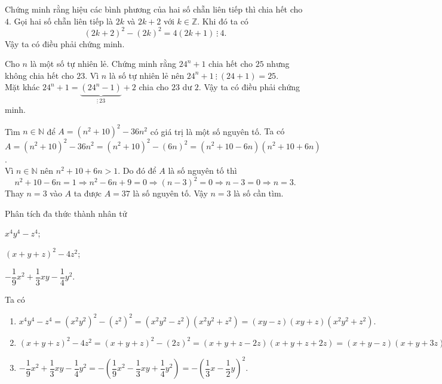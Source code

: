\begin{vd}
	Chứng minh rằng hiệu các bình phương của hai số chẵn liên tiếp thì chia hết cho $4$.
	\loigiai 
	{
		Gọi hai số chẵn liên tiếp là $2k$ và $2k+2$ với $k \in \mathbb{Z}$. Khi đó ta có
		\[(2k+2)^2 - (2k)^2 = 4(2k+1) \ \vdots \ 4.\]
		Vậy ta có điều phải chứng minh.
	}
\end{vd}

\begin{vd}
	Cho $n$ là một số tự nhiên lẻ. Chứng minh rằng $24^n + 1$ chia hết cho $25$ nhưng không chia hết cho $23$.
	\loigiai 
	{
		Vì $n$ là số tự nhiên lẻ nên $24^n + 1 \ \vdots \ (24+1) = 25$.  \\ 
		Mặt khác $24^n + 1 = \underbrace{\left(24^n - 1\right)}_{\vdots \ 23}  + 2$ chia cho $23$ dư $2$. Vậy ta có điều phải chứng minh.
	}
\end{vd}

\begin{vd}
	Tìm $n \in \mathbb{N}$ để $A = \left(n^2 + 10\right)^2 - 36n^2$ có giá trị là một số nguyên tố.
	\loigiai 
	{
		Ta có $A = \left(n^2 + 10\right)^2 - 36n^2 = \left(n^2 + 10\right)^2 - (6n)^2 = \left(n^2 + 10 - 6n\right)\left(n^2 + 10 + 6n\right)$. \\
		Vì $n \in \mathbb{N}$ nên $n^2 + 10 + 6n > 1$. Do đó để $A$ là số nguyên tố thì \[n^2 + 10 - 6n = 1 \Rightarrow n^2 - 6n + 9 = 0 \Rightarrow (n-3)^2 = 0 \Rightarrow n - 3 = 0 \Rightarrow n = 3.\]
		Thay $n = 3$ vào $A$ ta được $A = 37$ là số nguyên tố. Vậy $n = 3$ là số cần tìm.
	}
\end{vd}

\btvn
\begin{vn}
	Phân tích đa thức thành nhân tử 
	\begin{listEX}[3]
		\item $x^4y^4 - z^4$;
		\item $(x+y+z)^2 - 4z^2$;
		\item $- \dfrac{1}{9}x^2 + \dfrac{1}{3}xy - \dfrac{1}{4}y^2$.
	\end{listEX}
	\loigiai 
	{
		Ta có
		\begin{enumerate}
			\item $x^4y^4 - z^4 = \left(x^2y^2\right)^2 - \left(z^2\right)^2 = \left(x^2y^2 - z^2\right)\left(x^2y^2 + z^2\right) = (xy-z)(xy+z)\left(x^2y^2 + z^2\right).$
			\item $(x+y+z)^2 - 4z^2 = (x+y+z)^2 - (2z)^2 = (x+y+z-2z)(x+y+z+2z) = (x+y-z)(x+y+3z).$
			\item $- \dfrac{1}{9}x^2 + \dfrac{1}{3}xy - \dfrac{1}{4}y^2 = - \left(\dfrac{1}{9}x^2 - \dfrac{1}{3}xy + \dfrac{1}{4}y^2\right) = - \left(\dfrac{1}{3}x - \dfrac{1}{2}y\right)^2.$
		\end{enumerate}
	}
\end{vn}

